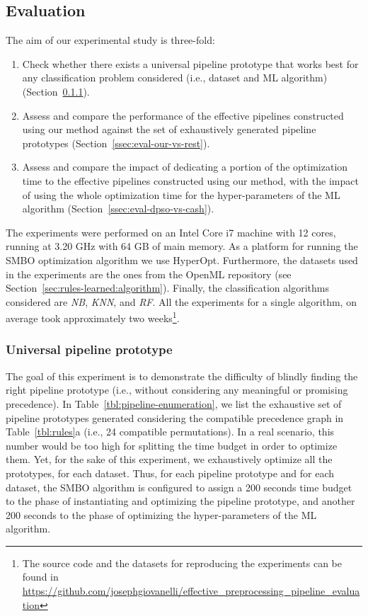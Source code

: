 \subsection{Evaluation}
\label{ssec:evaluation}

The aim of our experimental study is three-fold:
\begin{enumerate}
    \item Check whether there exists a universal pipeline prototype that works best for any classification problem considered  (i.e., dataset and ML algorithm) (Section~\ref{ssec:eval-universal-pipeline}).
    \item Assess and compare the performance of the effective pipelines constructed using our method against the set of exhaustively generated pipeline prototypes (Section~\ref{ssec:eval-our-vs-rest}).
    \item Assess and compare the impact of dedicating a portion of the optimization time to the effective pipelines constructed using our method, with the impact of using the whole optimization time for the hyper-parameters of the ML algorithm (Section~\ref{ssec:eval-dpso-vs-cash}).
\end{enumerate}

The experiments were performed on an Intel Core i7 machine with 12 cores, running at 3.20 GHz with 64 GB of main memory. As a platform for running the SMBO optimization algorithm we use HyperOpt. Furthermore, the datasets used in the experiments are the ones from the OpenML repository (see Section~\ref{sec:rules-learned:algorithm}). Finally, the classification algorithms considered are \textit{NB}, \textit{KNN}, and \textit{RF}. All the experiments for a single algorithm, on average took approximately two weeks\footnote{The source code and the datasets for reproducing the experiments can be found in 
\href{https://github.com/josephgiovanelli/effective\_preprocessing\_pipeline\_evaluation}{https://github.com/josephgiovanelli/effective\_preprocessing\_pipeline\_evaluation}}.

\subsubsection{Universal pipeline prototype}
\label{ssec:eval-universal-pipeline}
The goal of this experiment is to demonstrate the difficulty of blindly finding the right pipeline prototype (i.e., without considering any meaningful or promising precedence).
In Table~\ref{tbl:pipeline-enumeration}, we list the exhaustive set of pipeline prototypes generated considering the compatible precedence graph in Table~\ref{tbl:rules}a (i.e., 24 compatible permutations). In a real scenario, this number would be too high for splitting the time budget in order to optimize them. 
Yet, for the sake of this experiment, we exhaustively optimize all the prototypes, for each dataset. Thus, for each pipeline prototype and for each dataset, the SMBO algorithm is configured to assign a 200 seconds time budget to the phase of instantiating and optimizing the pipeline prototype, and another 200 seconds to the phase of optimizing the hyper-parameters of the ML algorithm.

